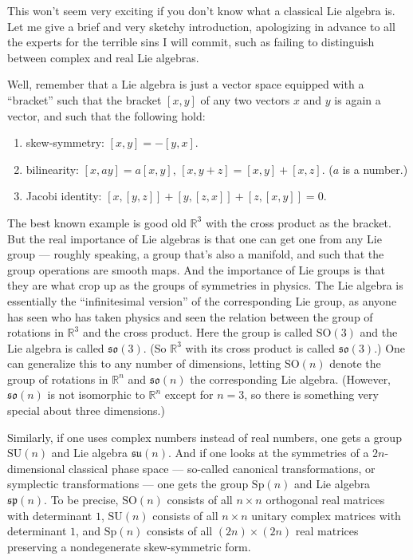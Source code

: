 \documentclass{article}
\def\tightlist{}
\begin{document}
This won't seem very exciting if you don't know what a classical Lie
algebra is. Let me give a brief and very sketchy introduction,
apologizing in advance to all the experts for the terrible sins I will
commit, such as failing to distinguish between complex and real Lie
algebras.

Well, remember that a Lie algebra is just a vector space equipped with a
``bracket'' such that the bracket \([x,y]\) of any two vectors \(x\) and
\(y\) is again a vector, and such that the following hold:

\begin{enumerate}
\def\labelenumi{\alph{enumi})}
\tightlist
\item
  skew-symmetry: \([x,y] = -[y,x]\).
\item
  bilinearity: \([x,ay] = a[x,y]\), \([x,y+z] = [x,y] + [x,z]\). (\(a\)
  is a number.)
\item
  Jacobi identity: \([x,[y,z]] + [y,[z,x]] + [z,[x,y]] = 0\).
\end{enumerate}

The best known example is good old \(\mathbb{R}^3\) with the cross
product as the bracket. But the real importance of Lie algebras is that
one can get one from any Lie group --- roughly speaking, a group that's
also a manifold, and such that the group operations are smooth maps. And
the importance of Lie groups is that they are what crop up as the groups
of symmetries in physics. The Lie algebra is essentially the
``infinitesimal version'' of the corresponding Lie group, as anyone has
seen who has taken physics and seen the relation between the group of
rotations in \(\mathbb{R}^3\) and the cross product. Here the group is
called \(\mathrm{SO}(3)\) and the Lie algebra is called
\(\mathfrak{so}(3)\). (So \(\mathbb{R}^3\) with its cross product is
called \(\mathfrak{so}(3)\).) One can generalize this to any number of
dimensions, letting \(\mathrm{SO}(n)\) denote the group of rotations in
\(\mathbb{R}^n\) and \(\mathfrak{so}(n)\) the corresponding Lie algebra.
(However, \(\mathfrak{so}(n)\) is not isomorphic to \(\mathbb{R}^n\)
except for \(n = 3\), so there is something very special about three
dimensions.)

Similarly, if one uses complex numbers instead of real numbers, one gets
a group \(\mathrm{SU}(n)\) and Lie algebra \(\mathfrak{su}(n)\). And if
one looks at the symmetries of a \(2n\)-dimensional classical phase
space --- so-called canonical transformations, or symplectic
transformations --- one gets the group \(\mathrm{Sp}(n)\) and Lie
algebra \(\mathfrak{sp}(n)\). To be precise, \(\mathrm{SO}(n)\) consists
of all \(n\times n\) orthogonal real matrices with determinant \(1\),
\(\mathrm{SU}(n)\) consists of all \(n\times n\) unitary complex
matrices with determinant \(1\), and \(\mathrm{Sp}(n)\) consists of all
\((2n)\times(2n)\) real matrices preserving a nondegenerate
skew-symmetric form.
\end{document}
